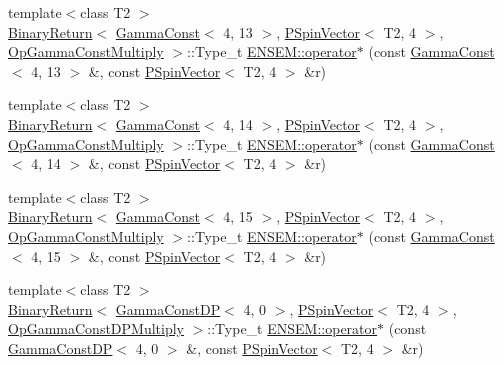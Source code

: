 \begin{DoxyCompactItemize}
\item 
{\footnotesize template$<$class T2 $>$ }\\\mbox{\hyperlink{structENSEM_1_1BinaryReturn}{Binary\+Return}}$<$ \mbox{\hyperlink{classENSEM_1_1GammaConst}{Gamma\+Const}}$<$ 4, 13 $>$, \mbox{\hyperlink{classENSEM_1_1PSpinVector}{P\+Spin\+Vector}}$<$ T2, 4 $>$, \mbox{\hyperlink{structENSEM_1_1OpGammaConstMultiply}{Op\+Gamma\+Const\+Multiply}} $>$\+::Type\+\_\+t \mbox{\hyperlink{group__primspinvector_ga7295695be69d983ea6fd8d3710a448d7}{E\+N\+S\+E\+M\+::operator$\ast$}} (const \mbox{\hyperlink{classENSEM_1_1GammaConst}{Gamma\+Const}}$<$ 4, 13 $>$ \&, const \mbox{\hyperlink{classENSEM_1_1PSpinVector}{P\+Spin\+Vector}}$<$ T2, 4 $>$ \&r)
\item 
{\footnotesize template$<$class T2 $>$ }\\\mbox{\hyperlink{structENSEM_1_1BinaryReturn}{Binary\+Return}}$<$ \mbox{\hyperlink{classENSEM_1_1GammaConst}{Gamma\+Const}}$<$ 4, 14 $>$, \mbox{\hyperlink{classENSEM_1_1PSpinVector}{P\+Spin\+Vector}}$<$ T2, 4 $>$, \mbox{\hyperlink{structENSEM_1_1OpGammaConstMultiply}{Op\+Gamma\+Const\+Multiply}} $>$\+::Type\+\_\+t \mbox{\hyperlink{group__primspinvector_ga890c8e465f4d1855cc9aa62f066b5679}{E\+N\+S\+E\+M\+::operator$\ast$}} (const \mbox{\hyperlink{classENSEM_1_1GammaConst}{Gamma\+Const}}$<$ 4, 14 $>$ \&, const \mbox{\hyperlink{classENSEM_1_1PSpinVector}{P\+Spin\+Vector}}$<$ T2, 4 $>$ \&r)
\item 
{\footnotesize template$<$class T2 $>$ }\\\mbox{\hyperlink{structENSEM_1_1BinaryReturn}{Binary\+Return}}$<$ \mbox{\hyperlink{classENSEM_1_1GammaConst}{Gamma\+Const}}$<$ 4, 15 $>$, \mbox{\hyperlink{classENSEM_1_1PSpinVector}{P\+Spin\+Vector}}$<$ T2, 4 $>$, \mbox{\hyperlink{structENSEM_1_1OpGammaConstMultiply}{Op\+Gamma\+Const\+Multiply}} $>$\+::Type\+\_\+t \mbox{\hyperlink{group__primspinvector_ga66707f89120c5b6f17816a485d9900eb}{E\+N\+S\+E\+M\+::operator$\ast$}} (const \mbox{\hyperlink{classENSEM_1_1GammaConst}{Gamma\+Const}}$<$ 4, 15 $>$ \&, const \mbox{\hyperlink{classENSEM_1_1PSpinVector}{P\+Spin\+Vector}}$<$ T2, 4 $>$ \&r)
\item 
{\footnotesize template$<$class T2 $>$ }\\\mbox{\hyperlink{structENSEM_1_1BinaryReturn}{Binary\+Return}}$<$ \mbox{\hyperlink{classENSEM_1_1GammaConstDP}{Gamma\+Const\+DP}}$<$ 4, 0 $>$, \mbox{\hyperlink{classENSEM_1_1PSpinVector}{P\+Spin\+Vector}}$<$ T2, 4 $>$, \mbox{\hyperlink{structENSEM_1_1OpGammaConstDPMultiply}{Op\+Gamma\+Const\+D\+P\+Multiply}} $>$\+::Type\+\_\+t \mbox{\hyperlink{group__primspinvector_ga90d081a5379c410e3a2225ba98128415}{E\+N\+S\+E\+M\+::operator$\ast$}} (const \mbox{\hyperlink{classENSEM_1_1GammaConstDP}{Gamma\+Const\+DP}}$<$ 4, 0 $>$ \&, const \mbox{\hyperlink{classENSEM_1_1PSpinVector}{P\+Spin\+Vector}}$<$ T2, 4 $>$ \&r)

\end{DoxyCompactItemize}
